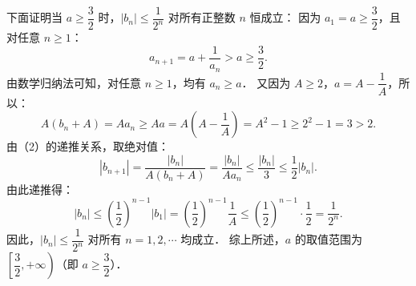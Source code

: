 \begin{answer}
下面证明当 $a \geqslant \dfrac{3}{2}$ 时，$|b_n| \leqslant \dfrac{1}{2^n}$ 对所有正整数 $n$ 恒成立：
因为 $a_1 = a \geqslant \dfrac{3}{2}$，且对任意 $n \geqslant 1$：
\nopagebreak[4]
\[
a_{n+1} = a + \frac{1}{a_n} > a \geqslant \frac{3}{2}.
\]
由数学归纳法可知，对任意 $n \geqslant 1$，均有 $a_n \geqslant a$．
又因为 $A \geqslant 2$，$a = A - \dfrac{1}{A}$，所以：
\nopagebreak[4]
\[
A(b_n + A) = A a_n \geqslant A a = A\left(A - \frac{1}{A}\right) = A^2 - 1 \geqslant 2^2 - 1 = 3 > 2.
\]
由（2）的递推关系，取绝对值：
\nopagebreak[4]
\[
|b_{n+1}| = \frac{|b_n|}{A(b_n + A)} = \frac{|b_n|}{A a_n} \leqslant \frac{|b_n|}{3} \leqslant \frac{1}{2}|b_n|.
\]
由此递推得：
\nopagebreak[4]
\[
|b_n| \leqslant \left(\frac{1}{2}\right)^{n-1} |b_1| = \left(\frac{1}{2}\right)^{n-1} \frac{1}{A} \leqslant \left(\frac{1}{2}\right)^{n-1} \cdot \frac{1}{2} = \frac{1}{2^n}.
\]
因此，$|b_n| \leqslant \dfrac{1}{2^n}$ 对所有 $n = 1, 2, \cdots$ 均成立．
综上所述，$a$ 的取值范围为 $\left[\dfrac{3}{2}, +\infty\right)$（即 $a \geqslant \dfrac{3}{2}$）．

\gkanswer{答案：（1）$A = \dfrac{a + \sqrt{a^2 + 4}}{2}$；（2）证明见解析；（3）$a \geqslant \dfrac{3}{2}$（或 $\left[\dfrac{3}{2}, +\infty\right)$）}

\end{answer}